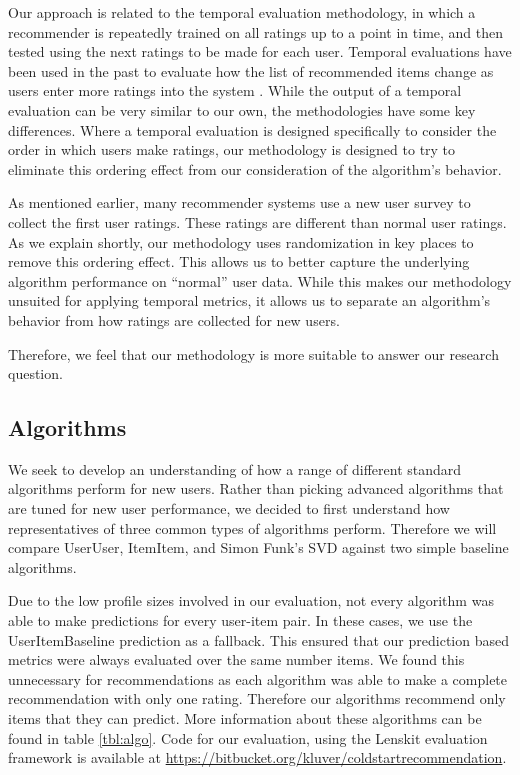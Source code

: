 \documentclass[letterpaper]{sig-alternate}
\begin{document}
  Our approach is related to the temporal evaluation methodology, in which a recommender is repeatedly trained on all ratings up to a point in time, and then tested using the next ratings to be made for each user.
  Temporal evaluations have been used in the past to evaluate how the list of recommended items change as users enter more ratings into the system \cite{LathiaTemporal}.
  While the output of a temporal evaluation can be very similar to our own, the methodologies have some key differences.
  Where a temporal evaluation is designed specifically to consider the order in which users make ratings, our methodology is designed to try to eliminate this ordering effect from our consideration of the algorithm's behavior.

  As mentioned earlier, many recommender systems use a new user survey to collect the first user ratings.
  These ratings are different than normal user ratings.
  As we explain shortly, our methodology uses randomization in key places to remove this ordering effect.
  This allows us to better capture the underlying algorithm performance on ``normal'' user data.
  While this makes our methodology unsuited for applying temporal metrics, it allows us to separate an algorithm's behavior from how ratings are collected for new users.
  

Therefore, we feel that our methodology is more suitable to answer our research question.

  \subsection*{Algorithms}

  We seek to develop an understanding of how a range of different standard algorithms perform for new users.
  Rather than picking advanced algorithms that are tuned for new user performance, we decided to first understand how representatives of three common types of algorithms perform.
  Therefore we will compare UserUser\cite{resnick1994grouplens}, ItemItem\cite{sarwar2001item}, and Simon Funk's SVD\cite{funk_netflix_2006} against two simple baseline algorithms.
  
  Due to the low profile sizes involved in our evaluation, not every algorithm was able to make predictions for every user-item pair.
  In these cases, we use the UserItemBaseline prediction as a fallback.
  This ensured that our prediction based metrics were always evaluated over the same number items.
  We found this unnecessary for recommendations as each algorithm was able to make a complete recommendation with only one rating.
  Therefore our algorithms recommend only items that they can predict.
  More information about these algorithms can be found in table \ref{tbl:algo}.
  Code for our evaluation, using the Lenskit evaluation framework \cite{lenskit} is available at \url{https://bitbucket.org/kluver/coldstartrecommendation}.
  
\end{document}
